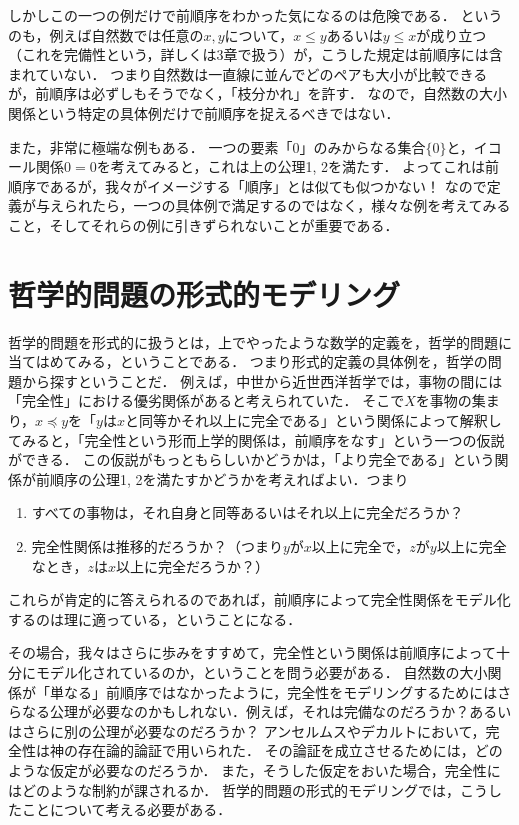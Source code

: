 \documentclass[11pt,a4paper]{jsarticle}
\begin{document}
しかしこの一つの例だけで前順序をわかった気になるのは危険である．
というのも，例えば自然数では任意の$x,y$について，$x \leq y$あるいは$y \leq x$が成り立つ（これを完備性という，詳しくは3章で扱う）が，こうした規定は前順序には含まれていない．
つまり自然数は一直線に並んでどのペアも大小が比較できるが，前順序は必ずしもそうでなく，「枝分かれ」を許す．
なので，自然数の大小関係という特定の具体例だけで前順序を捉えるべきではない．

また，非常に極端な例もある．
一つの要素「0」のみからなる集合$\{ 0 \}$と，イコール関係$0 = 0$を考えてみると，これは上の公理1, 2を満たす．
よってこれは前順序であるが，我々がイメージする「順序」とは似ても似つかない！
なので定義が与えられたら，一つの具体例で満足するのではなく，様々な例を考えてみること，そしてそれらの例に引きずられないことが重要である．




\section{哲学的問題の形式的モデリング}

哲学的問題を形式的に扱うとは，上でやったような数学的定義を，哲学的問題に当てはめてみる，ということである．
つまり形式的定義の具体例を，哲学の問題から探すということだ．
例えば，中世から近世西洋哲学では，事物の間には「完全性」における優劣関係があると考えられていた．
そこで$X$を事物の集まり，$x \preceq y$を「$y$は$x$と同等かそれ以上に完全である」という関係によって解釈してみると，「完全性という形而上学的関係は，前順序をなす」という一つの仮説ができる．
この仮説がもっともらしいかどうかは，「より完全である」という関係が前順序の公理1, 2を満たすかどうかを考えればよい．つまり
\begin{enumerate}
 \item すべての事物は，それ自身と同等あるいはそれ以上に完全だろうか？
 \item 完全性関係は推移的だろうか？（つまり$y$が$x$以上に完全で，$z$が$y$以上に完全なとき，$z$は$x$以上に完全だろうか？）
\end{enumerate}
これらが肯定的に答えられるのであれば，前順序によって完全性関係をモデル化するのは理に適っている，ということになる．

その場合，我々はさらに歩みをすすめて，完全性という関係は前順序によって十分にモデル化されているのか，ということを問う必要がある．
自然数の大小関係が「単なる」前順序ではなかったように，完全性をモデリングするためにはさらなる公理が必要なのかもしれない．例えば，それは完備なのだろうか？あるいはさらに別の公理が必要なのだろうか？
アンセルムスやデカルトにおいて，完全性は神の存在論的論証で用いられた．
その論証を成立させるためには，どのような仮定が必要なのだろうか．
また，そうした仮定をおいた場合，完全性にはどのような制約が課されるか．
哲学的問題の形式的モデリングでは，こうしたことについて考える必要がある．
\end{document}
